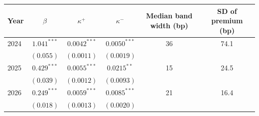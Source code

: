 \begin{tabular}{lccccc}
\toprule
 Year & $\beta$ & $\kappa^+$ & $\kappa^-$ & Median band width (bp) & SD of premium (bp) \\
\midrule
2024 & $1.041^{***}$ & $0.0042^{***}$ & $0.0050^{***}$ & 36 & 74.1 \\
 & $(0.055)$ & $(0.0011)$ & $(0.0019)$ & & \\
2025 & $0.429^{***}$ & $0.0055^{***}$ & $0.0215^{**}$ & 15 & 24.5 \\
 & $(0.039)$ & $(0.0012)$ & $(0.0093)$ & & \\
2026 & $0.249^{***}$ & $0.0059^{***}$ & $0.0085^{***}$ & 21 & 16.4 \\
 & $(0.018)$ & $(0.0013)$ & $(0.0020)$ & & \\
\bottomrule
\end{tabular}
